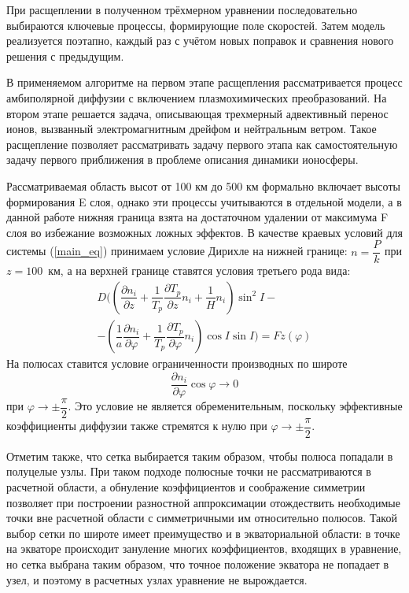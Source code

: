 \documentclass[14pt, a4paper]{extarticle}
\begin{document}
При расщеплении в полученном трёхмерном уравнении последовательно выбираются ключевые процессы, формирующие поле скоростей. Затем модель реализуется поэтапно, каждый раз с учётом новых поправок и сравнения нового решения с предыдущим. 


В применяемом алгоритме на первом этапе расщепления рассматривается процесс амбиполярной диффузии с включением плазмохимических преобразований. На втором этапе решается задача, описывающая трехмерный адвективный перенос ионов, вызванный электромагнитным дрейфом и нейтральным ветром. Такое расщепление позволяет рассматривать задачу первого этапа как самостоятельную задачу первого приближения в проблеме описания динамики ионосферы.

Рассматриваемая область высот от 100 км до 500 км формально включает высоты формирования E слоя, однако эти процессы учитываются в отдельной модели, а в данной работе нижняя граница взята на достаточном удалении от максимума F слоя во избежание возможных ложных эффектов. В качестве краевых условий для системы (\ref{main_eq}) принимаем условие Дирихле на нижней границе: $n = \dfrac{P}{k}$  при $z = 100$~км, а на верхней границе ставятся условия третьего рода вида:
\begin{gather}\label{ub}
D\bigg(\left(\dfrac{\partial n_i}{\partial z} + \dfrac{1}{T_p}\dfrac{\partial T_p}{\partial z} n_i + \dfrac{1}{H}n_i\right)\sin^2 I - \nonumber\\ 
-\left(\dfrac{1}{a}\dfrac{\partial n_i}{\partial\varphi} + \dfrac{1}{T_p}\dfrac{\partial T_p}{\partial\varphi} n_i\right)\cos I \sin I\bigg) = Fz(\varphi)
\end{gather}
На полюсах ставится условие ограниченности производных по широте $$\dfrac{\partial n_i}{\partial\varphi}\cos\varphi \rightarrow 0$$ при $\varphi\rightarrow \pm \dfrac{\pi}{2}$. Это условие не является обременительным, поскольку эффективные коэффициенты диффузии также стремятся к нулю при $\varphi\rightarrow \pm \dfrac{\pi}{2}$.

Отметим также, что сетка выбирается таким образом, чтобы полюса попадали в полуцелые узлы. При таком подходе полюсные точки не рассматриваются в расчетной области, а обнуление коэффициентов и соображение симметрии позволяет при построении разностной аппроксимации отождествить необходимые точки вне расчетной области с симметричными им относительно полюсов. Такой выбор сетки по широте имеет преимущество и в экваториальной области: в точке на экваторе происходит зануление многих коэффициентов, входящих в уравнение, но сетка выбрана таким образом, что точное положение экватора не попадает в узел, и поэтому в расчетных узлах уравнение не вырождается.
\end{document}
